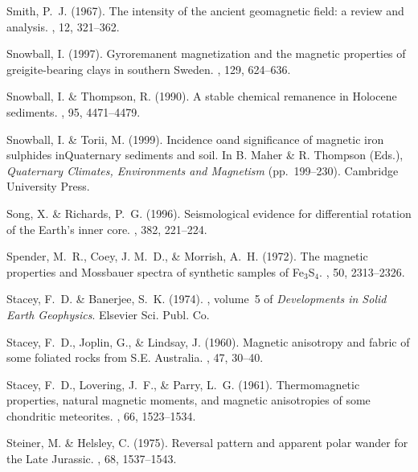 Smith, P.~J. (1967).
\newblock The intensity of the ancient geomagnetic field: a review and
  analysis.
, 12, 321--362.

Snowball, I. (1997).
\newblock Gyroremanent magnetization and the magnetic properties of
  greigite-bearing clays in southern Sweden.
, 129, 624--636.

Snowball, I. \& Thompson, R. (1990).
\newblock A stable chemical remanence in Holocene sediments.
, 95, 4471--4479.

Snowball, I. \& Torii, M. (1999).
\newblock Incidence oand significance of magnetic iron sulphides inQuaternary
  sediments and soil.
\newblock In B. Maher \& R. Thompson (Eds.), {\em Quaternary Climates,
  Environments and Magnetism}  (pp.\ 199--230). Cambridge University Press.

Song, X. \& Richards, P.~G. (1996).
\newblock Seismological evidence for differential rotation of the Earth's inner
  core.
, 382, 221--224.

Spender, M.~R., Coey, J. M.~D., \& Morrish, A.~H. (1972).
\newblock The magnetic properties and Mossbauer spectra of synthetic samples of
  Fe$_3$S$_4$.
, 50, 2313--2326.

Stacey, F.~D. \& Banerjee, S.~K. (1974).
, volume~5 of {\em
  Developments in Solid Earth Geophysics}.
\newblock Elsevier Sci. Publ. Co.

Stacey, F.~D., Joplin, G., \& Lindsay, J. (1960).
\newblock Magnetic anisotropy and fabric of some foliated rocks from S.E.
  Australia.
, 47, 30--40.

Stacey, F.~D., Lovering, J.~F., \& Parry, L.~G. (1961).
\newblock Thermomagnetic properties, natural magnetic moments, and magnetic
  anisotropies of some chondritic meteorites.
, 66, 1523--1534.

Steiner, M. \& Helsley, C. (1975).
\newblock Reversal pattern and apparent polar wander for the Late Jurassic.
, 68, 1537--1543.

